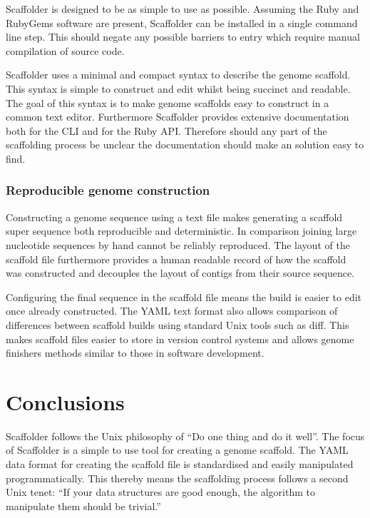 \documentclass[10pt]{bmc_article}
\newenvironment{bmcformat}{\begin{raggedright}\baselineskip20pt\sloppy\setboolean{publ}{false}}{\end{raggedright}\baselineskip20pt\sloppy}
\begin{document}
\begin{bmcformat}
Scaffolder is designed to be as simple to use as possible. Assuming the Ruby
and RubyGems software are present, Scaffolder can be installed in a single
command line step. This should negate any possible barriers to entry which
require manual compilation of source code. \pb

Scaffolder uses a minimal and compact syntax to describe the genome scaffold.
This syntax is simple to construct and edit whilst being succinct and readable.
The goal of this syntax is to make genome scaffolds easy to construct in
a common text editor. Furthermore Scaffolder provides extensive documentation
both for the CLI and for the Ruby API. Therefore should any part of the
scaffolding process be unclear the documentation should make an solution easy
to find. \pb

\subsubsection*{Reproducible genome construction} %

Constructing a genome sequence using a text file makes generating a scaffold
super sequence both reproducible and deterministic. In comparison joining large
nucleotide sequences by hand cannot be reliably reproduced. The layout of the
scaffold file furthermore provides a human readable record of how the scaffold
was constructed and decouples the layout of contigs from their source sequence.
\pb

Configuring the final sequence in the scaffold file means the build is easier
to edit once already constructed. The YAML text format also allows comparison
of differences between scaffold builds using standard Unix tools such as diff.
This makes scaffold files easier to store in version control systems and allows
genome finishers methods similar to those in software development. \pb 

\clearpage

\section*{Conclusions} %

Scaffolder follows the Unix philosophy of ``Do one thing and do it well''. The
focus of Scaffolder is a simple to use tool for creating a genome scaffold. The
YAML data format for creating the scaffold file is standardised and easily
manipulated programmatically. This thereby means the scaffolding process
follows a second Unix tenet: ``If your data structures are good enough, the
algorithm to manipulate them should be trivial.''


\end{bmcformat}
\end{document}
